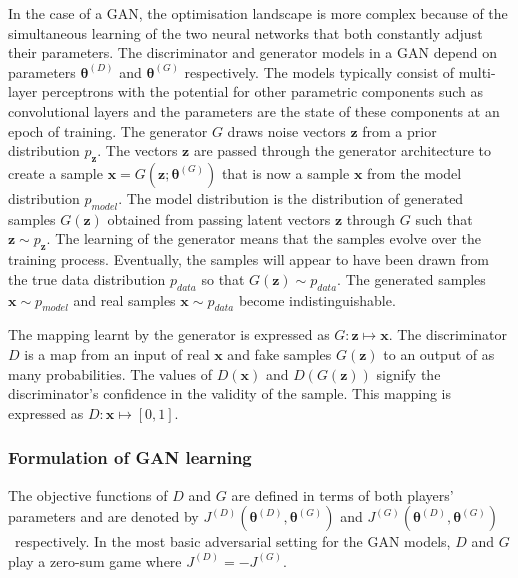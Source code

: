 \documentclass[twocolumn]{article}
\numberwithin{equation}{section}
\begin{document}
In the case of a GAN, the optimisation landscape is more complex because of the simultaneous learning of the two 
neural networks that both constantly adjust their parameters. The discriminator and generator models in a GAN depend 
on parameters $\bm{\theta}^{(D)}$ and $\bm{\theta}^{(G)}$ respectively. The models typically consist of multi-layer 
perceptrons with the potential for other parametric components such as convolutional layers and the parameters are 
the state of these components at an epoch of training. The generator $G$ draws noise vectors $\mathbf{z}$ from a prior 
distribution $p_{\mathbf{z}}$. The vectors $\mathbf{z}$ are passed through the generator architecture to create a 
sample $\mathbf{x}=G(\mathbf{z};\bm{\theta}^{(G)})$ that is now a sample $\mathbf{x}$ from the model distribution 
$p_{model}$. The model distribution is the distribution of generated samples $G(\mathbf{z})$ obtained from passing 
latent vectors $\mathbf{z}$ through $G$ such that $\mathbf{z} \sim p_{\mathbf{z}}$. The learning of the generator 
means that the samples evolve over the training process. Eventually, the samples will appear to have been drawn 
from the true data distribution $p_{data}$ so that $G(\mathbf{z}) \sim p_{data}$. The generated samples 
$\mathbf{x} \sim p_{model}$ and real samples $\mathbf{x} \sim p_{data}$ become indistinguishable. 

The mapping learnt by the generator is expressed as $G \! : \! \mathbf{z} \! \mapsto \! \mathbf{x}$. The 
discriminator $D$ is a map from an input of real $\mathbf{x}$ and fake samples $G(\mathbf{z})$ to an output of 
as many probabilities. The values of  $D(\mathbf{x})$ and $D(G(\mathbf{z}))$ signify the discriminator's confidence 
in the validity of the sample. This mapping is expressed as $D \! : \! \mathbf{x} \!  \mapsto \! [0,1]$. 


\subsubsection{Formulation of GAN learning}
The objective functions of $D$ and $G$ are defined in terms of both players' parameters and are denoted by 
$J^{(D)}(\bm{\theta}^{(D)}, \bm{\theta}^{(G)})$ and $J^{(G)}(\bm{\theta}^{(D)}, \bm{\theta}^{(G)})$~respectively. 
In the most basic adversarial setting for the GAN models, $D$ and $G$ play a zero-sum game where $J^{(D)} = - J^{(G)}$.
\end{document}
